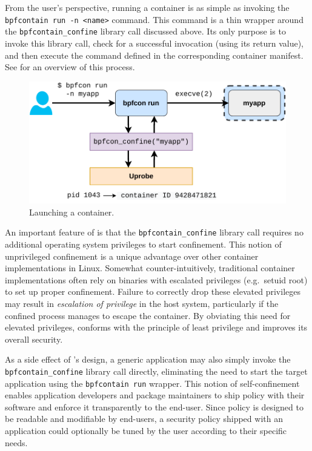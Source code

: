 From the user's perspective, running a \bpfcontain{} container is as simple as invoking the \texttt{bpfcontain run -n <name>} command. This command is a thin wrapper around the \texttt{bpfcontain\_confine} library call discussed above. Its only purpose is to invoke this library call, check for a successful invocation (using its return value), and then execute the command defined in the corresponding container manifest. See  for an overview of this process.

\begin{figure}[htb]
  \centering
  \includegraphics[width=0.6\linewidth]{figs/launch.pdf}
  \caption{Launching a \bpfcontain{} container.}%
  \label{fig:launch}
\end{figure}

An important feature of \bpfcontain{} is that the \lstinline[language=c]|bpfcontain_confine| library call requires no additional operating system privileges to start confinement.  This notion of unprivileged confinement is a unique advantage over other container implementations in Linux.  Somewhat counter-intuitively, traditional container implementations often rely on binaries with escalated privileges (e.g.~setuid root) to set up proper confinement.  Failure to correctly drop these elevated privileges may result in \textit{escalation of privilege} in the host system, particularly if the confined process manages to escape the container.  By obviating this need for elevated privileges, \bpfcontain{} conforms with the principle of least privilege and improves its overall security.

As a side effect of \bpfcontain{}'s design, a generic application may also simply invoke the \lstinline[language=c]|bpfcontain_confine| library call directly, eliminating the need to start the target application using the \texttt{bpfcontain run} wrapper. This notion of self-confinement enables application developers and package maintainers to ship \bpfcontain{} policy with their software and enforce it transparently to the end-user. Since \bpfcontain{} policy is designed to be readable and modifiable by end-users, a security policy shipped with an application could optionally be tuned by the user according to their specific needs.

